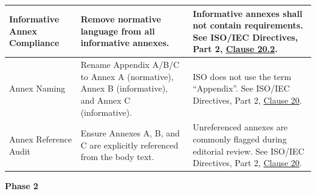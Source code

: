 \documentclass[11pt,a4paper]{article}
\begin{document}
\begin{table}[h]
\begin{tabular}{|l|l|l|}
Informative Annex Compliance & Remove normative language from all informative annexes. & Informative annexes shall not contain requirements. See ISO/IEC Directives, Part 2, \href{https://www.iso.org/sites/directives/current/part2/index.xhtml\#\_idTextAnchor005}{Clause 20.2}. \\ \hline
Annex Naming & Rename Appendix A/B/C to Annex A (normative), Annex B (informative), and Annex C (informative). & ISO does not use the term “Appendix”. See ISO/IEC Directives, Part 2, \href{https://www.iso.org/sites/directives/current/part2/index.xhtml\#\_idTextAnchor005}{Clause 20}. \\ \hline
Annex Reference Audit & Ensure Annexes A, B, and C are explicitly referenced from the body text. & Unreferenced annexes are commonly flagged during editorial review. See ISO/IEC Directives, Part 2, \href{https://www.iso.org/sites/directives/current/part2/index.xhtml\#\_idTextAnchor005}{Clause 20}. \\ \hline
\end{tabular}
\end{table}

\textbf{Phase 2}
\end{document}
